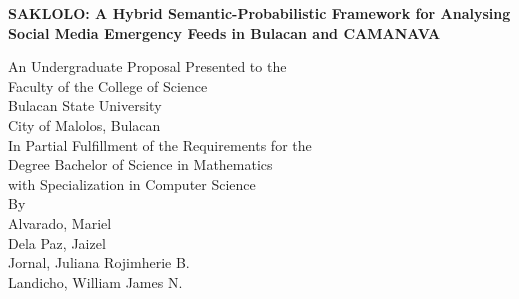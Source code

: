 \begin{titlepage}
	\centering
	{\Large\bfseries SAKLOLO: A Hybrid Semantic-Probabilistic Framework for
		Analysing Social Media Emergency Feeds in Bulacan and CAMANAVA\par}
	\vspace{2.5cm}
	
	An Undergraduate Proposal Presented to the\\
	Faculty of the College of Science\\
	Bulacan State University\\
	City of Malolos, Bulacan\\[1.2cm]
	
	In Partial Fulfillment of the Requirements for the\\
	Degree Bachelor of Science in Mathematics\\
	with Specialization in Computer Science\\[2.5cm]
	
	By\\[0.6cm]
	Alvarado, Mariel\\ %
	Dela Paz, Jaizel\\ %
	Jornal, Juliana Rojimherie B.\\ %
	Landicho, William James N.\\[2.5cm] %
	
\end{titlepage}
